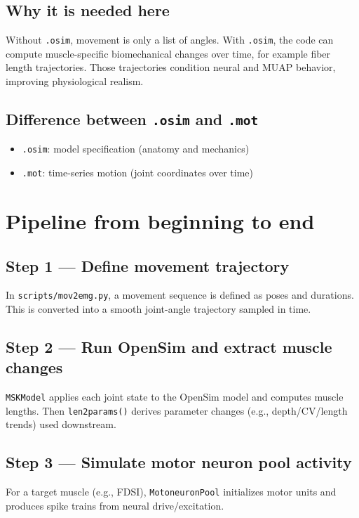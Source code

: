 \documentclass[11pt,a4paper]{article}
\begin{document}
\subsection*{Why it is needed here}
Without \texttt{.osim}, movement is only a list of angles. With \texttt{.osim}, the code can compute muscle-specific biomechanical changes over time, for example fiber length trajectories. Those trajectories condition neural and MUAP behavior, improving physiological realism.

\subsection*{Difference between \texttt{.osim} and \texttt{.mot}}
\begin{itemize}
    \item \texttt{.osim}: model specification (anatomy and mechanics)
    \item \texttt{.mot}: time-series motion (joint coordinates over time)
\end{itemize}

\section{Pipeline from beginning to end}

\subsection*{Step 1 --- Define movement trajectory}
In \texttt{scripts/mov2emg.py}, a movement sequence is defined as poses and durations.
This is converted into a smooth joint-angle trajectory sampled in time.

\subsection*{Step 2 --- Run OpenSim and extract muscle changes}
\texttt{MSKModel} applies each joint state to the OpenSim model and computes muscle lengths.
Then \texttt{len2params()} derives parameter changes (e.g., depth/CV/length trends) used downstream.

\subsection*{Step 3 --- Simulate motor neuron pool activity}
For a target muscle (e.g., FDSI), \texttt{MotoneuronPool} initializes motor units and produces spike trains from neural drive/excitation.
\end{document}
